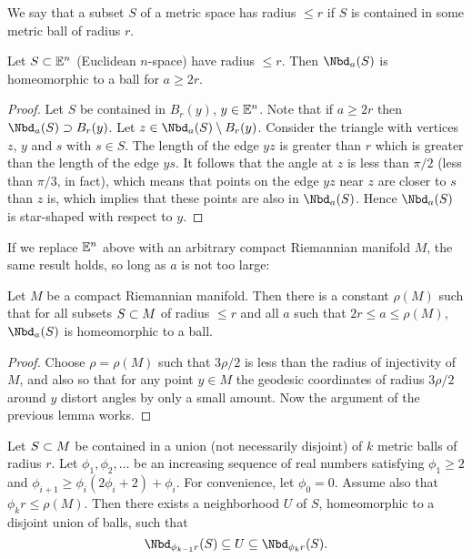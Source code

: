 We say that a subset $S$ of a metric space has radius $\le r$ if $S$ is contained in
some metric ball of radius $r$.

\begin{lemma}
Let $S \subset \mathbb{E}^n$ (Euclidean $n$-space) have radius $\le r$.  
Then $\Nbd_a(S)$ is homeomorphic to a ball for $a \ge 2r$.
\end{lemma}

\begin{proof} \label{xxyy2}
Let $S$ be contained in $B_r(y)$, $y \in \mathbb{E}^n$.
Note that if $a \ge 2r$ then $\Nbd_a(S) \sup B_r(y)$.
Let $z\in \Nbd_a(S) \setmin B_r(y)$.
Consider the triangle
 with vertices $z$, $y$ and $s$ with $s\in S$.
The length of the edge $yz$ is greater than $r$ which is greater
than the length of the edge $ys$.
It follows that the angle at $z$ is less than $\pi/2$ (less than $\pi/3$, in fact),
which means that points on the edge $yz$ near $z$ are closer to $s$ than $z$ is,
which implies that these points are also in $\Nbd_a(S)$.
Hence $\Nbd_a(S)$ is star-shaped with respect to $y$.
\end{proof}

If we replace $\mathbb{E}^n$ above with an arbitrary compact Riemannian manifold $M$,
the same result holds, so long as $a$ is not too large:

\begin{lemma} \label{xxzz11}
Let $M$ be a compact Riemannian manifold.
Then there is a constant $\rho(M)$ such that for all
subsets $S\subset M$ of radius $\le r$ and all $a$ such that $2r \le a \le \rho(M)$,
$\Nbd_a(S)$ is homeomorphic to a ball.
\end{lemma}

\begin{proof}
Choose $\rho = \rho(M)$ such that $3\rho/2$ is less than the radius of injectivity of $M$,
and also so that for any point $y\in M$ the geodesic coordinates of radius $3\rho/2$ around
$y$ distort angles by only a small amount.
Now the argument of the previous lemma works.
\end{proof}



\begin{lemma} \label{xx2phi}
Let $S \subset M$ be contained in a union (not necessarily disjoint)
of $k$ metric balls of radius $r$.
Let $\phi_1, \phi_2, \ldots$ be an increasing sequence of real numbers satisfying
$\phi_1 \ge 2$ and $\phi_{i+1} \ge \phi_i(2\phi_i + 2) + \phi_i$.
For convenience, let $\phi_0 = 0$.
Assume also that $\phi_k r \le \rho(M)$.
Then there exists a neighborhood $U$ of $S$,
homeomorphic to a disjoint union of balls, such that
\[
	\Nbd_{\phi_{k-1} r}(S) \subeq U \subeq \Nbd_{\phi_k r}(S) .
\]
\end{lemma}

